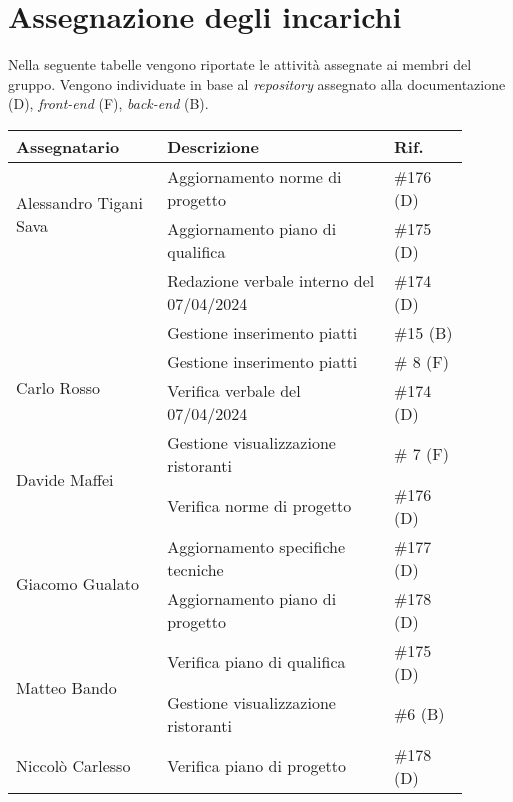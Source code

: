 \section{Assegnazione degli incarichi}
Nella seguente tabelle vengono riportate le attività assegnate ai membri del gruppo.
Vengono individuate in base al \textit{repository} assegnato alla documentazione (D), \textit{front-end} (F), \textit{back-end} (B).
\begin{center}
	{
		\renewcommand{\arraystretch}{1.5}
		\begin{tabular}{p{0.30\linewidth}|p{0.45\linewidth}|p{0.15\linewidth}}
			\textbf{Assegnatario}          			& \textbf{Descrizione}				& \textbf{Rif.} \\
			\hline
			\multirow{2}{*}{Alessandro Tigani Sava}	& Aggiornamento norme di progetto	& \#176 (D)	\\
			\cline{2-3}
													& Aggiornamento piano di qualifica	& \#175	(D)	\\
			\cline{2-3}
													& Redazione verbale interno del 07/04/2024	& \#174	(D)	\\
			\cline{2-3}
													& Gestione inserimento piatti		& \#15 (B)	\\
			\hline
			\multirow{2}{*}{Carlo Rosso}   			& Gestione inserimento piatti		& \# 8 (F)	\\
			\cline{2-3}
			                               			& Verifica verbale del 07/04/2024	& \#174	(D)	\\
			\hline
			\multirow{2}{*}{Davide Maffei} 			& Gestione visualizzazione ristoranti	& \# 7 (F)	\\
			\cline{2-3}
			                               			& Verifica norme di progetto		& \#176 (D)	\\
			\hline
			\multirow{2}{*}{Giacomo Gualato}		& Aggiornamento specifiche tecniche	& \#177 (D)	\\
			\cline{2-3}
			                               			& Aggiornamento piano di progetto	& \#178 (D)	\\
			\hline
			\multirow{2}{*}{Matteo Bando}  			& Verifica piano di qualifica		& \#175	(D)	\\
			\cline{2-3}
			                               			& Gestione visualizzazione ristoranti	& \#6 (B)	\\
			\hline
			Niccolò Carlesso               			& Verifica piano di progetto		& \#178 (D)	\\
			\hline
		\end{tabular}
	}
\end{center}
